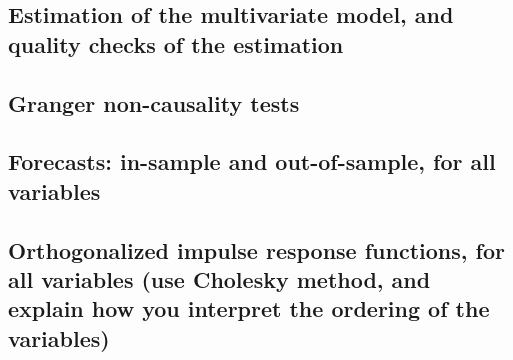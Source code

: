 \documentclass[12pt]{article}
\begin{document}
\subsection{Estimation of the multivariate model, and quality checks of the estimation}

\subsection{Granger non-causality tests}

\subsection{Forecasts: in-sample and out-of-sample, for all variables}

\subsection{Orthogonalized impulse response functions, for all variables (use Cholesky method, and explain how you interpret the ordering of the variables)}
\end{document}

